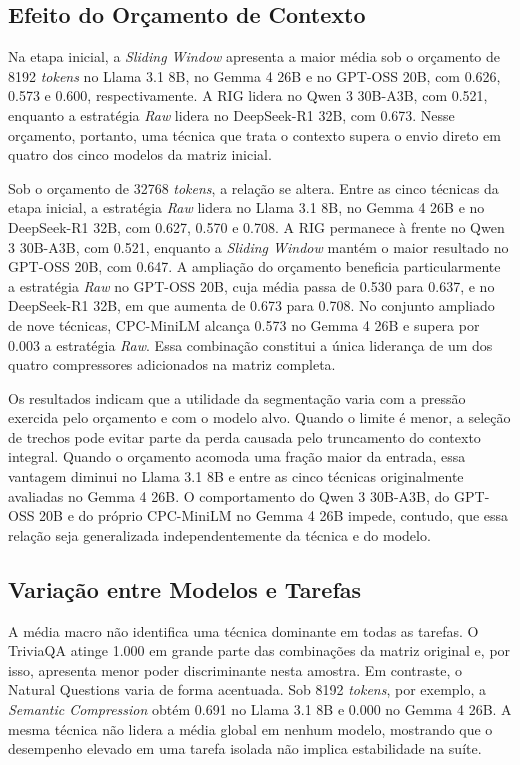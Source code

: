 \subsection{Efeito do Orçamento de Contexto}

Na etapa inicial, a \textit{Sliding Window} apresenta a maior média sob o orçamento de 8192 \textit{tokens} no Llama 3.1 8B, no Gemma 4 26B e no GPT-OSS 20B, com 0.626, 0.573 e 0.600, respectivamente. A RIG lidera no Qwen 3 30B-A3B, com 0.521, enquanto a estratégia \textit{Raw} lidera no DeepSeek-R1 32B, com 0.673. Nesse orçamento, portanto, uma técnica que trata o contexto supera o envio direto em quatro dos cinco modelos da matriz inicial.

Sob o orçamento de 32768 \textit{tokens}, a relação se altera. Entre as cinco técnicas da etapa inicial, a estratégia \textit{Raw} lidera no Llama 3.1 8B, no Gemma 4 26B e no DeepSeek-R1 32B, com 0.627, 0.570 e 0.708. A RIG permanece à frente no Qwen 3 30B-A3B, com 0.521, enquanto a \textit{Sliding Window} mantém o maior resultado no GPT-OSS 20B, com 0.647. A ampliação do orçamento beneficia particularmente a estratégia \textit{Raw} no GPT-OSS 20B, cuja média passa de 0.530 para 0.637, e no DeepSeek-R1 32B, em que aumenta de 0.673 para 0.708. No conjunto ampliado de nove técnicas, CPC-MiniLM alcança 0.573 no Gemma 4 26B e supera por 0.003 a estratégia \textit{Raw}. Essa combinação constitui a única liderança de um dos quatro compressores adicionados na matriz completa.

Os resultados indicam que a utilidade da segmentação varia com a pressão exercida pelo orçamento e com o modelo alvo. Quando o limite é menor, a seleção de trechos pode evitar parte da perda causada pelo truncamento do contexto integral. Quando o orçamento acomoda uma fração maior da entrada, essa vantagem diminui no Llama 3.1 8B e entre as cinco técnicas originalmente avaliadas no Gemma 4 26B. O comportamento do Qwen 3 30B-A3B, do GPT-OSS 20B e do próprio CPC-MiniLM no Gemma 4 26B impede, contudo, que essa relação seja generalizada independentemente da técnica e do modelo.

\subsection{Variação entre Modelos e Tarefas}

A média macro não identifica uma técnica dominante em todas as tarefas. O TriviaQA atinge 1.000 em grande parte das combinações da matriz original e, por isso, apresenta menor poder discriminante nesta amostra. Em contraste, o Natural Questions varia de forma acentuada. Sob 8192 \textit{tokens}, por exemplo, a \textit{Semantic Compression} obtém 0.691 no Llama 3.1 8B e 0.000 no Gemma 4 26B. A mesma técnica não lidera a média global em nenhum modelo, mostrando que o desempenho elevado em uma tarefa isolada não implica estabilidade na suíte.

